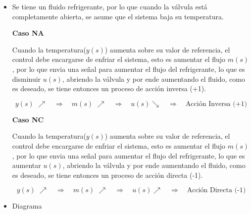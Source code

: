 \begin{ejercicio}
  \begin{itemize}
    \item 
    Se tiene un fluido refrigerante, por lo que cuando la válvula está completamente abierta, se asume que el sistema baja su temperatura.\\\par

    \textbf{Caso NA}\par
    Cuando la temperatura($y(s)$) aumenta sobre su valor de referencia, el control debe encargarse de enfriar el sistema, esto es aumentar el flujo $m(s)$, por lo que envia una señal para aumentar el flujo del refrigerante, lo que es disminuir $u(s)$, abriendo la válvula y por ende aumentando el fluido, como es deseado, se tiene entonces un proceso de acción inversa (+1).

    \begin{equation*}
      y(s) \mspace{6mu} \nearrow  \quad \Rightarrow \quad  m(s) \mspace{6mu} \nearrow  \quad \Rightarrow \quad  u(s) \searrow \quad \Rightarrow \quad \text{Acción Inversa (+1)}
    \end{equation*}

    \textbf{Caso NC}\par
    Cuando la temperatura($y(s)$) aumenta sobre su valor de referencia, el control debe encargarse de enfriar el sistema, esto es aumentar el flujo $m(s)$, por lo que envia una señal para aumentar el flujo del refrigerante, lo que es aumentar $u(s)$, abriendo la válvula y por ende aumentando el fluido, como es deseado, se tiene entonces un proceso de acción directa (-1).

    \begin{equation*}
      y(s) \mspace{6mu} \nearrow  \quad \Rightarrow \quad  m(s) \mspace{6mu} \nearrow  \quad \Rightarrow \quad  u(s) \nearrow \quad \Rightarrow \quad \text{Acción Directa (-1)}
    \end{equation*}

  \item
  Diagrama
  \end{itemize}
\end{ejercicio}